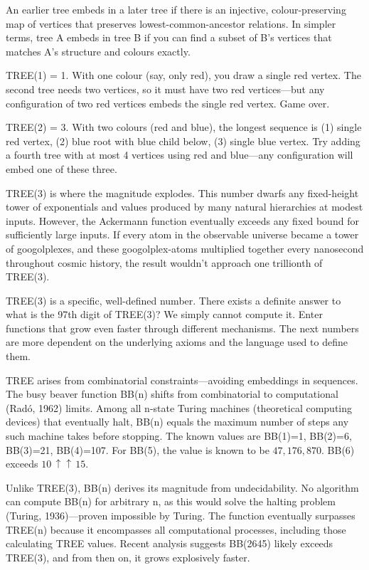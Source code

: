 An earlier tree embeds in a later tree if there is an injective, colour-preserving map of vertices that preserves lowest-common-ancestor relations. In simpler terms, tree A embeds in tree B if you can find a subset of B's vertices that matches A's structure and colours exactly.

TREE(1) = 1. With one colour (say, only red), you draw a single red vertex. The second tree needs two vertices, so it must have two red vertices—but any configuration of two red vertices embeds the single red vertex. Game over.

TREE(2) = 3. With two colours (red and blue), the longest sequence is (1) single red vertex, (2) blue root with blue child below, (3) single blue vertex. Try adding a fourth tree with at most 4 vertices using red and blue—any configuration will embed one of these three.

TREE(3) is where the magnitude explodes. This number dwarfs any fixed-height tower of exponentials and values produced by many natural hierarchies at modest inputs. However, the Ackermann function eventually exceeds any fixed bound for sufficiently large inputs. If every atom in the observable universe became a tower of googolplexes, and these googolplex-atoms multiplied together every nanosecond throughout cosmic history, the result wouldn't approach one trillionth of TREE(3).

TREE(3) is a specific, well-defined number. There exists a definite answer to \QENOpen{}what is the 97th digit of TREE(3)?\QENClose{} We simply cannot compute it. Enter functions that grow even faster through different mechanisms. The next numbers are more dependent on the underlying axioms and the language used to define them.

TREE arises from combinatorial constraints—avoiding embeddings in sequences. The busy beaver function BB(n) shifts from combinatorial to computational (Radó, 1962) limits. Among all n-state Turing machines (theoretical computing devices) that eventually halt, BB(n) equals the maximum number of steps any such machine takes before stopping. The known values are BB(1)=1, BB(2)=6, BB(3)=21, BB(4)=107. For BB(5), the value is known to be $47{,}176{,}870$. BB(6) exceeds $10\,\uparrow\!\uparrow\,15$.

Unlike TREE(3), BB(n) derives its magnitude from undecidability. No algorithm can compute BB(n) for arbitrary n, as this would solve the halting problem (Turing, 1936)—proven impossible by Turing. The function eventually surpasses TREE(n) because it encompasses all computational processes, including those calculating TREE values. Recent analysis suggests BB(2645) likely exceeds TREE(3), and from then on, it grows explosively faster.

